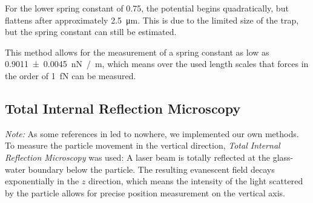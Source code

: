 \documentclass[
    twoside=false,
    twocolumn=true,
    fontsize=11pt,
]{scrarticle}
\begin{document}
For the lower spring constant of \SI{0.75}{}, the potential begins quadratically, but flattens after approximately \SI{2.5}{\micro m}.
This is due to the limited size of the trap, but the spring constant can still be estimated.

This method allows for the measurement of a spring constant as low as \SI{0.9011(45)}{\nano N /m}, which means over the used length scales that forces in the order of \SI{1}{\femto N} can be measured.

\subsection{Total Internal Reflection Microscopy}
\textit{Note:} As some references in \cite{instructions} led to nowhere, we implemented our own methods.\\
To measure the particle movement in the vertical direction, \textit{Total Internal Reflection Microscopy} was used: A laser beam is totally reflected at the glass-water boundary below the particle. The resulting evanescent field decays exponentially in the $z$ direction, which means the intensity of the light scattered by the particle allows for precise position measurement on the vertical axis.
\end{document}
